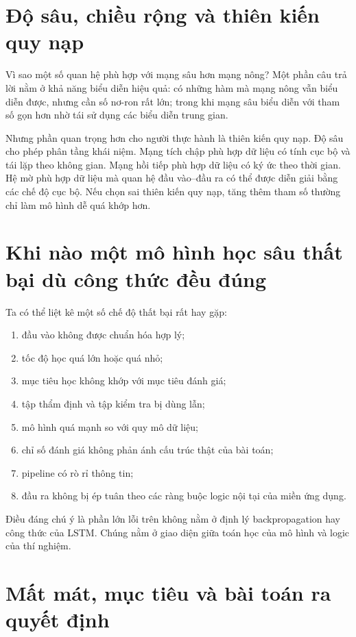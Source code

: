 \section{Độ sâu, chiều rộng và thiên kiến quy nạp}

Vì sao một số quan hệ phù hợp với mạng sâu hơn mạng nông? Một phần câu trả lời nằm ở khả năng biểu diễn hiệu quả: có những hàm mà mạng nông vẫn biểu diễn được, nhưng cần số nơ-ron rất lớn; trong khi mạng sâu biểu diễn với tham số gọn hơn nhờ tái sử dụng các biểu diễn trung gian.

Nhưng phần quan trọng hơn cho người thực hành là thiên kiến quy nạp. Độ sâu cho phép phân tầng khái niệm. Mạng tích chập phù hợp dữ liệu có tính cục bộ và tái lặp theo không gian. Mạng hồi tiếp phù hợp dữ liệu có ký ức theo thời gian. Hệ mờ phù hợp dữ liệu mà quan hệ đầu vào--đầu ra có thể được diễn giải bằng các chế độ cục bộ. Nếu chọn sai thiên kiến quy nạp, tăng thêm tham số thường chỉ làm mô hình dễ quá khớp hơn.

\section{Khi nào một mô hình học sâu thất bại dù công thức đều đúng}

Ta có thể liệt kê một số chế độ thất bại rất hay gặp:

\begin{enumerate}
\item đầu vào không được chuẩn hóa hợp lý;
\item tốc độ học quá lớn hoặc quá nhỏ;
\item mục tiêu học không khớp với mục tiêu đánh giá;
\item tập thẩm định và tập kiểm tra bị dùng lẫn;
\item mô hình quá mạnh so với quy mô dữ liệu;
\item chỉ số đánh giá không phản ánh cấu trúc thật của bài toán;
\item pipeline có rò rỉ thông tin;
\item đầu ra không bị ép tuân theo các ràng buộc logic nội tại của miền ứng dụng.
\end{enumerate}

Điều đáng chú ý là phần lớn lỗi trên không nằm ở định lý backpropagation hay công thức của LSTM. Chúng nằm ở giao diện giữa toán học của mô hình và logic của thí nghiệm.

\section{Mất mát, mục tiêu và bài toán ra quyết định}

